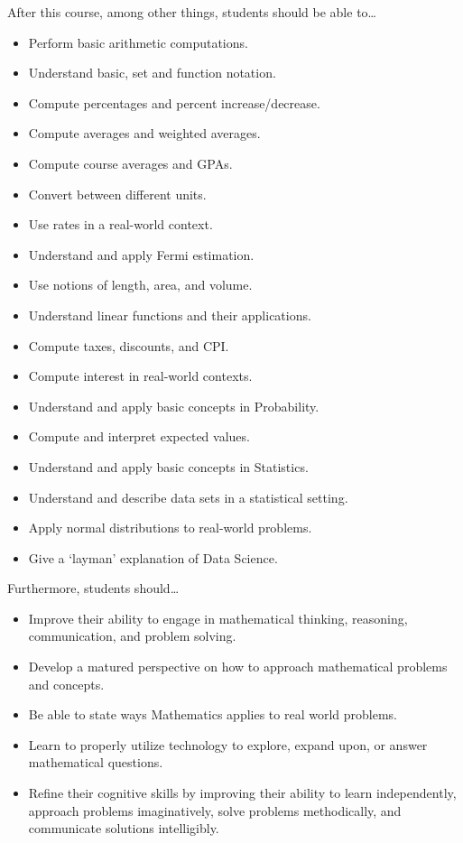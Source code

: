\documentclass[11pt,letterpaper]{article}
\begin{document}
After this course, among other things, students should be able to\dots
	\begin{itemize} \itemsep=0.3ex
	\item Perform basic arithmetic computations.
	\item Understand basic, set and function notation.
	\item Compute percentages and percent increase/decrease.
	\item Compute averages and weighted averages.
	\item Compute course averages and GPAs.
	\item Convert between different units.
	\item Use rates in a real-world context. 
	\item Understand and apply Fermi estimation.
	\item Use notions of length, area, and volume. 
	\item Understand linear functions and their applications.
	\item Compute taxes, discounts, and CPI.
	\item Compute interest in real-world contexts. 
	\item Understand and apply basic concepts in Probability. 
	\item Compute and interpret expected values. 
	\item Understand and apply basic concepts in Statistics. 
	\item Understand and describe data sets in a statistical setting. 
	\item Apply normal distributions to real-world problems.
	\item Give a `layman' explanation of Data Science. 
	\end{itemize}
Furthermore, students should\dots
	\begin{itemize} \itemsep=0.3ex
	\item  Improve their ability to engage in mathematical thinking, reasoning, communication, and problem solving.
	\item Develop a matured perspective on how to approach mathematical problems and concepts.
	\item Be able to state ways Mathematics applies to real world problems.
	\item Learn to properly utilize technology to explore, expand upon, or answer mathematical questions.
	\item Refine their cognitive skills by improving their ability to learn independently, approach problems imaginatively, solve problems methodically, and communicate solutions intelligibly.
	\end{itemize}
\sectionbreak
\end{document}
